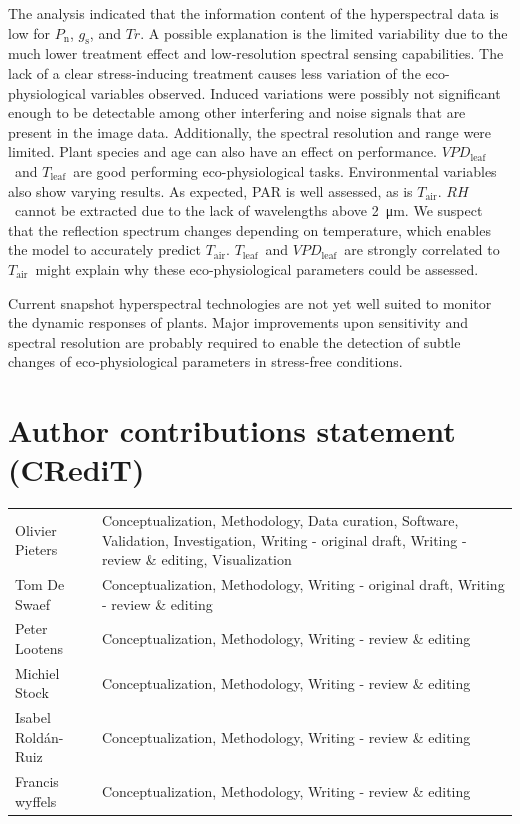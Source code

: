 \documentclass[10pt,authoryear,a4paper]{elsarticle}
\newcommand{\VPDL}{$VPD_\text{leaf}$}
\newcommand{\Tair}{$T_\text{air}$}
\newcommand{\Tleaf}{$T_\text{leaf}$}
\newcommand{\Cond}{$g_\text{s}$}
\newcommand{\Photo}{$P_\text{n}$}
\newcommand{\Transp}{$Tr$}
\newcommand{\RH}{$RH$}
\begin{document}
    The analysis indicated that the information content of the hyperspectral data is low for \Photo, \Cond, and \Transp. A possible explanation is the limited variability due to the much lower treatment effect and low-resolution spectral sensing capabilities. The lack of a clear stress-inducing treatment causes less variation of the eco-physiological variables observed. Induced variations were possibly not significant enough to be detectable among other interfering and noise signals that are present in the image data. Additionally, the spectral resolution and range were limited. Plant species and age can also have an effect on performance.  \VPDL\ and \Tleaf\ are good performing eco-physiological tasks. Environmental variables also show varying results. As expected, PAR is well assessed, as is \Tair. \RH\ cannot be extracted due to the lack of wavelengths above \SI{2}{\micro\metre}. We suspect that the reflection spectrum changes depending on temperature, which enables the model to accurately predict \Tair. \Tleaf\ and \VPDL\ are strongly correlated to \Tair\ might explain why these eco-physiological parameters could be assessed.
    
    Current snapshot hyperspectral technologies are not yet well suited to monitor the dynamic responses of plants. Major improvements upon sensitivity and spectral resolution are probably required to enable the detection of subtle changes of eco-physiological parameters in stress-free conditions.
    
    \FloatBarrier

    
    


\section{Author contributions statement (CRediT)}

    
    \noindent
    \begin{tabularx}{\linewidth}{@{}lX}
    Olivier Pieters & Conceptualization, Methodology, Data curation, Software, Validation, Investigation, Writing - original draft, Writing - review \& editing, Visualization\\
    Tom De Swaef & Conceptualization, Methodology, Writing - original draft, Writing - review \& editing\\
    Peter Lootens & Conceptualization, Methodology, Writing - review \& editing\\
    Michiel Stock & Conceptualization, Methodology, Writing - review \& editing\\
    Isabel Rold\'an-Ruiz & Conceptualization, Methodology, Writing - review \& editing\\
    Francis wyffels & Conceptualization, Methodology, Writing - review \& editing\\
    \end{tabularx}
\end{document}
